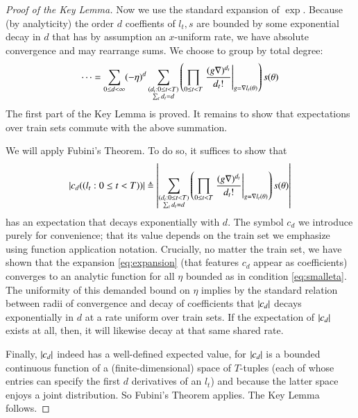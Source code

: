 \begin{proof}[Proof of the Key Lemma]
            Now we use the standard expansion of $\exp$.  Because (by
            analyticity) the order $d$ coeffients of $l_t, s$ are bounded by
            some exponential decay in $d$ that has by assumption an $x$-uniform
            rate, we have absolute convergence and may rearrange sums.  We
            choose to group by total degree:
            \begin{equation} \label{eq:expansion}
                \cdots 
                =
                \sum_{0\leq d < \infty} (-\eta)^d
                \sum_{\substack{(d_t: 0\leq t<T) \\ \sum_t d_t = d}}
                \left(
                    \prod_{0 \leq t < T} \left.
                        \frac{(g \nabla)^{d_t}}{d_t!}
                    \right|_{g=\nabla l_t(\theta)}
                \right) s (\theta)
            \end{equation}
            The first part of the Key Lemma is proved.  It remains to show that
            expectations over train sets commute with the above summation.

            We will apply Fubini's Theorem.  To do so, it suffices to show that   
            $$
                \left|c_d((l_t: 0\leq t<T))\right| 
                \triangleq
                \left|
                    \sum_{\substack{(d_t: 0\leq t<T) \\ \sum_t d_t = d}}
                    \left(
                        \prod_{0 \leq t < T} \left.
                            \frac{(g \nabla)^{d_t}}{d_t!}
                        \right|_{g=\nabla l_t(\theta)}
                    \right) s (\theta)
                \right|
            $$
            has an expectation that decays exponentially with $d$.  The symbol
            $c_d$ we introduce purely for convenience; that its value depends
            on the train set we emphasize using function application
            notation.  Crucially, no matter the train set, we have shown
            that the expansion \ref{eq:expansion} (that features $c_d$ appear
            as coefficients) converges to an analytic function for all $\eta$
            bounded as in condition \ref{eq:smalleta}.  The uniformity of this
            demanded bound on $\eta$ implies by the standard relation between
            radii of convergence and decay of coefficients that $\left|c_d\right|$
            decays exponentially in $d$ at a rate uniform over train sets.
            If the expectation of $\left|c_d\right|$ exists at all, then, it will
            likewise decay at that same shared rate.
            
            Finally, $\left|c_d\right|$ indeed has a well-defined expected value, for
            $\left|c_d\right|$ is a bounded continuous function of a
            (finite-dimensional) space of $T$-tuples (each of whose entries can
            specify the first $d$ derivatives of an $l_t$) and because the
            latter space enjoys a joint distribution.  So Fubini's Theorem
            applies.  The Key Lemma follows.   
        \end{proof}

